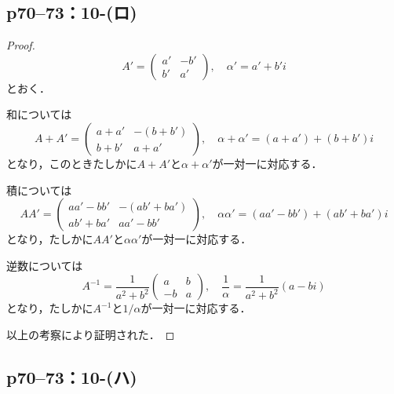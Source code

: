 \documentclass[a4paper,10pt,fleqn]{ltjsarticle}
\begin{document}
\newpage


\subsection*{p70--73：10-(ロ)}

\begin{tleftbar}
    \begin{proof}
        \[
            A' = \begin{pmatrix} a' & -b' \\ b' & a' \end{pmatrix} , \quad \alpha ' = a' + b' i
        \]
        とおく．

        和については
        \[
            A+A' = \begin{pmatrix} a+a' & -(b+b') \\ b+b' & a+a' \end{pmatrix} , \quad \alpha + \alpha ' = (a+a') + (b+b') i
        \]
        となり，このときたしかに$A+A'$と$\alpha + \alpha '$が一対一に対応する．

        積については
        \[
            A A' = \begin{pmatrix} a a' - b b' & - (a b' + b a') \\ a b' + b a' & a a' - b b' \end{pmatrix} , \quad \alpha \alpha ' = (a a' - b b') + (a b' + b a') i
        \]
        となり，たしかに$AA'$と$\alpha \alpha '$が一対一に対応する．

        逆数については
        \[
            A^{-1} = \frac{1}{a^2+b^2} \begin{pmatrix} a & b \\ -b & a \end{pmatrix},\quad \frac{1}{\alpha} = \frac{1}{a^2+b^2}(a -bi )
        \]
        となり，たしかに$A^{-1}$と$1/\alpha$が一対一に対応する．

        以上の考察により証明された．
    \end{proof}
\end{tleftbar}


\newpage

\subsection*{p70--73：10-(ハ)}
\end{document}
